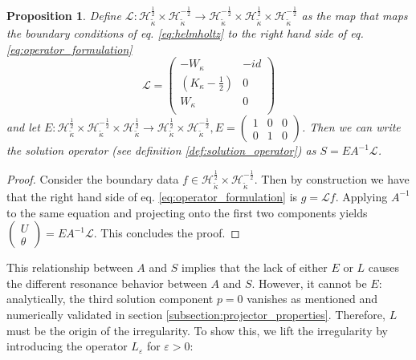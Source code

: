 \documentclass[12pt,journal,compsoc, onecolumn]{IEEEtran}
\newtheorem{proposition}[theorem]{Proposition}
\begin{document}
\begin{proposition}
Define
    $\mathcal{L}: \mathcal{H}_{\tilde \kappa}^{\frac{1}{2}} \times \mathcal{H}_{\tilde \kappa}^{-\frac{1}{2}} \rightarrow \mathcal{H}_{\tilde \kappa}^{-\frac{1}{2}} \times \mathcal{H}_{\tilde \kappa}^{\frac{1}{2}} \times \mathcal{H}_{\tilde \kappa}^{-\frac{1}{2}}$ as the map that maps the boundary conditions of eq. \ref{eq:helmholtz} to the right hand side of eq. \ref{eq:operator_formulation}
    $$
        \mathcal{L} = 
        \begin{pmatrix}
            -W_{\kappa} & -id \\
            (K_{\kappa} - \frac{1}{2}) & 0 \\
            W_{\kappa} & 0 \\
        \end{pmatrix}
    $$
and let
 ${E}: \mathcal{H}_{\tilde{\kappa}}^{\frac{1}{2}} \times \mathcal{H}_{\tilde{\kappa}}^{-\frac{1}{2}} \times \mathcal{H}_{\tilde{\kappa}}^{\frac{1}{2}} \rightarrow \mathcal{H}_{\tilde{\kappa}}^{\frac{1}{2}} \times \mathcal{H}_{\tilde{\kappa}}^{-\frac{1}{2}}, {E} = \begin{pmatrix}
    1 & 0 & 0 \\
    0 & 1 & 0 
\end{pmatrix}$.
    Then we can write the solution operator (see definition \ref{def:solution_operator}) as 
    $S = 
    {E}
    A^{-1} \mathcal{L}
    $.
\end{proposition}
\begin{proof}
    Consider the boundary data $f \in \mathcal{H}_{\tilde \kappa}^{\frac{1}{2}} \times \mathcal{H}_{\tilde \kappa}^{-\frac{1}{2}}$. Then by construction we have that the right hand side of eq. \ref{eq:operator_formulation} is $g = \mathcal{L} f$. Applying $A^{-1}$ to the same equation and projecting onto the first two components yields $\begin{pmatrix} U \\ \theta  \end{pmatrix} = {E}A^{-1} \mathcal{L}$. This concludes the proof.
\end{proof}  \noindent
This relationship between $A$ and $S$ implies that the lack of either $E$ or $L$ causes the different resonance behavior between $A$ and $S$. However, it cannot be $E$: analytically, the third solution component $p = 0$ vanishes as mentioned and numerically validated in section \ref{subsection:projector_properties}. Therefore, $L$ must be the origin of the irregularity. To show this, we lift the irregularity by introducing the operator $L_\varepsilon$ for $\varepsilon > 0$: 
\end{document}
